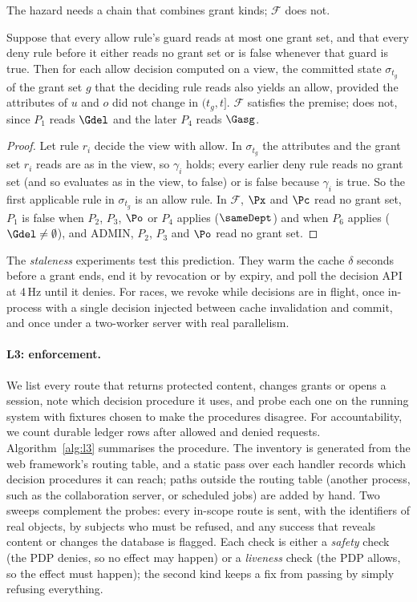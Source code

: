 The hazard needs a chain that combines grant kinds; $\mathcal{F}$ does not.

\begin{proposition}\label{prop:witness}
Suppose that every allow rule's guard reads at most one grant set, and that every deny rule before it either reads
no grant set or is false whenever that guard is true. Then for each allow decision computed on a view, the
committed state $\sigma_{t_g}$ of the grant set $g$ that the deciding rule reads also yields an allow, provided the
attributes of $u$ and $o$ did not change in $(t_g,t]$. $\mathcal{F}$ satisfies the premise; \chain does not, since
$P_1$ reads $\Gdel$ and the later $P_4$ reads $\Gasg$.
\end{proposition}
\begin{proof}
Let rule $r_i$ decide the view with allow. In $\sigma_{t_g}$ the attributes and the grant set $r_i$ reads are as in
the view, so $\gamma_i$ holds; every earlier deny rule reads no grant set (and so evaluates as in the view, to
false) or is false because $\gamma_i$ is true. So the first applicable rule in $\sigma_{t_g}$ is an allow rule.
In $\mathcal{F}$, $\Px$ and $\Pc$ read no grant set, $P_1$ is false when $P_2$, $P_3$, $\Po$ or $P_4$ applies
($\sameDept$) and when $P_6$ applies ($\Gdel\neq\emptyset$), and ADMIN, $P_2$, $P_3$ and $\Po$ read no grant set.
\end{proof}


The \emph{staleness} experiments test this prediction. They warm the cache $\delta$ seconds before a grant ends,
end it by revocation or by expiry, and poll the decision API at 4\,Hz until it denies. For
races, we revoke while decisions are in flight, once in-process with a single decision injected between cache
invalidation and commit, and once under a two-worker server with real parallelism.

\paragraph{L3: enforcement.} We list every route that returns protected content, changes grants or opens a
session, note which decision procedure it uses, and probe each one on the running system with fixtures chosen
to make the procedures disagree. For accountability, we count durable ledger rows after allowed and denied
requests. Algorithm~\ref{alg:l3} summarises the procedure. The inventory is generated from the web framework's
routing table, and a static pass over each handler records which decision procedures it can reach; paths outside
the routing table (another process, such as the collaboration server, or scheduled jobs) are added by hand. Two
sweeps complement the probes: every in-scope route is sent, with the identifiers of real objects, by subjects who
must be refused, and any success that reveals content or changes the database is flagged. Each check is either a \emph{safety} check (the PDP denies, so no effect may happen) or a
\emph{liveness} check (the PDP allows, so the effect must happen); the second kind keeps a fix from passing by
simply refusing everything.

